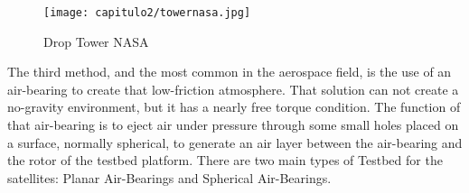 \begin{figure}[H]
	\centering
		\texttt{[image: capitulo2/towernasa.jpg]}
	\caption{Drop Tower NASA \cite{nasatower}}
	\label{fig:towernasa}
\end{figure}

The third method, and the most common in the aerospace field, is the use of an air-bearing to create that low-friction atmosphere. That solution can not create a no-gravity environment, but it has a nearly free torque condition. The function of that air-bearing is to eject air under pressure through some small holes placed on a surface, normally spherical, to generate an air layer between the air-bearing and the rotor of the testbed platform.
There are two main types of Testbed for the satellites: Planar Air-Bearings and Spherical Air-Bearings. 

